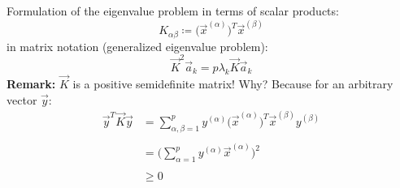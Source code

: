 Formulation of the eigenvalue problem in terms of scalar products:
\begin{equation}
	K_{\alpha \beta} \coloneqq \Big( \vec{x}^{(\alpha)} \Big)^T 
		\vec{x}^{(\beta)}
\end{equation}
in matrix notation (generalized eigenvalue problem):
\begin{equation}
	\vec{K}^2 \vec{a}_k = p \lambda_k \vec{K} \vec{a}_k
\end{equation}
\textbf{Remark:} $\vec{K}$ is a positive semidefinite matrix! Why? Because
for an arbitrary vector $\vec{y}$:
\begin{equation}
	\begin{array}{ll}
	\vec{y}^T \vec{K} \vec{y} 
	& = \sum\limits_{\alpha, \beta = 1}^p
		y^{(\alpha)} \Big( \vec{x}^{(\alpha)} \Big)^T
		\vec{x}^{(\beta)} y^{(\beta)} \\\\
	& = \Bigg( \sum\limits_{\alpha = 1}^p y^{(\alpha)} \vec{x}^{(\alpha)}
		\Bigg)^2 \\\\
	& \geq 0
	\end{array}
\end{equation}

